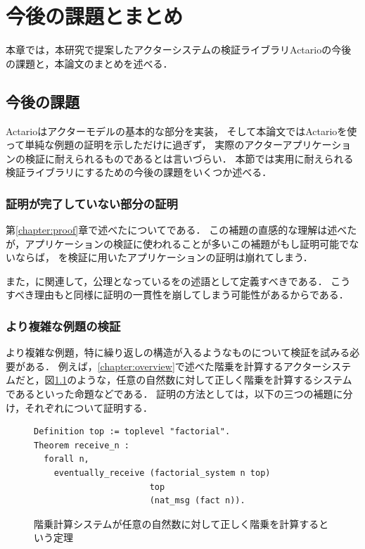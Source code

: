 \chapter{今後の課題とまとめ}
\label{chapter:conclusion}

本章では，本研究で提案したアクターシステムの検証ライブラリActarioの今後の課題と，本論文のまとめを述べる．

\section{今後の課題}

Actarioはアクターモデルの基本的な部分を実装，
そして本論文ではActarioを使って単純な例題の証明を示しただけに過ぎず，
実際のアクターアプリケーションの検証に耐えられるものであるとは言いづらい．
本節では実用に耐えられる検証ライブラリにするための今後の課題をいくつか述べる．

\subsection{証明が完了していない部分の証明}
第\ref{chapter:proof}章で述べたについてである．
この補題の直感的な理解は述べたが，アプリケーションの検証に使われることが多いこの補題がもし証明可能でないならば，
を検証に用いたアプリケーションの証明は崩れてしまう．

また，に関連して，公理となっているをの述語として定義すべきである．
こうすべき理由もと同様に証明の一貫性を崩してしまう可能性があるからである．

\subsection{より複雑な例題の検証}
より複雑な例題，特に繰り返しの構造が入るようなものについて検証を試みる必要がある．
例えば，\ref{chapter:overview}で述べた階乗を計算するアクターシステムだと，図\ref{code:conclusion:fact-n}のような，任意の自然数に対して正しく階乗を計算するシステムであるといった命題などである．
証明の方法としては，以下の三つの補題に分け，それぞれについて証明する．

\begin{figure}[tp]
\begin{lstlisting}
Definition top := toplevel "factorial".
Theorem receive_n :
  forall n,
    eventually_receive (factorial_system n top)
                       top
                       (nat_msg (fact n)).
\end{lstlisting}
  \caption{階乗計算システムが任意の自然数に対して正しく階乗を計算するという定理}\label{code:conclusion:fact-n}
\end{figure}

